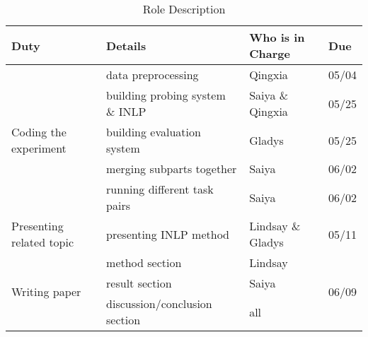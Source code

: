 \documentclass[11pt,a4paper]{article}
\begin{document}
\begin{table*}[ht]
    \centering
    \begin{tabular}{llll}
    \hline
    \textbf{Duty} & \textbf{Details} & \textbf{Who is in Charge} &\textbf{Due} \\
    \hline
    \multirow{5}{*}{Coding the experiment} & data preprocessing & Qingxia & 05/04 \\
    & building probing system \& INLP & Saiya \& Qingxia & 05/25 \\
    & building evaluation system & Gladys & 05/25 \\
    & merging subparts together & Saiya & 06/02\\ 
    & running different task pairs & Saiya & 06/02\\
    \hline
    \multirow{2}{*}{Presenting related topic} & \multirow{2}{*}{presenting INLP method} & \multirow{2}{*}{Lindsay \& Gladys} & \multirow{2}{*}{05/11}\\
    & & & \\
    \hline
    \multirow{3}{*}{Writing paper} & method section  & Lindsay & \multirow{3}{*}{06/09}  \\
     & result section & Saiya &  \\
     & discussion/conclusion section & all & \\
    \hline
    \end{tabular}
    \caption{\label{role description} Role Description
    }
    \end{table*}









\end{document}
